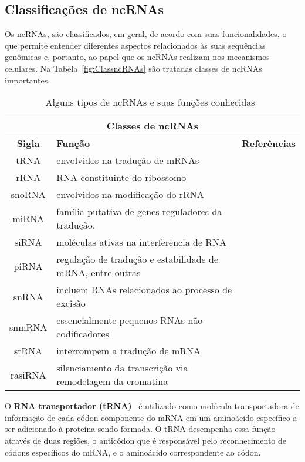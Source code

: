 \subsection{Classificações de ncRNAs} \label{sec:ClassNCrnas}

Os ncRNAs, são classificados, em geral, de acordo com suas funcionalidades, o que permite entender diferentes aspectos relacionados às suas sequências genômicas e, portanto, ao papel que os ncRNAs realizam nos mecanismos celulares. Na Tabela~\ref{fig:ClassncRNAs} são tratadas classes de ncRNAs importantes.

\begin{table}[ht]
 \caption{Alguns tipos de ncRNAs e suas funções conhecidas~\citep{setubal1997introduction:1997,eddy2001non:2001}} \label{fig:ClassncRNAs}\begin{tabular}{|c|l|l|}
\hline
\multicolumn{ 3}{|c|}{\textbf{Classes de ncRNAs}} \\ \hline
\textbf{Sigla} &  \textbf{Função}   & \textbf{Referências} \\ \hline
tRNA &  envolvidos na tradução de mRNAs &~\citep{pavon2009trna:2009}\\ \hline
rRNA &  RNA constituinte do ribossomo &~\citep{eddy2001non:2001} \\ \hline
snoRNA &  envolvidos na modificação do rRNA &~\citep{durbin1998biological:1998}  \\ \hline
miRNA &  família putativa de genes reguladores da tradução. &~\citep{mendell2005micrornas:2005}  \\ \hline
siRNA &  moléculas ativas na interferência de RNA &~\citep{eddy2001non:2001}\\ \hline
piRNA &  regulação de tradução e estabilidade de mRNA, entre outras &~\citep{brennecke2007discrete:2007}  \\ \hline
snRNA &  incluem RNAs relacionados ao processo de excisão &~\citep{stryer:2002}\\ \hline
snmRNA &  essencialmente pequenos RNAs não-codificadores &~\citep{huttenhofer2001rnomics:2001}  \\ \hline
stRNA &  interrompem a tradução de mRNA &~\citep{eddy2001non:2001}  \\ \hline
rasiRNA &  silenciamento da transcrição via remodelagem da cromatina &~\citep{xie2004genetic:2004}  \\ \hline
\end{tabular}
\label{}
\end{table}


O \textbf{RNA transportador (tRNA)}~\citep{pavon2009trna:2009} é utilizado como molécula transportadora de informação de cada códon componente do mRNA em um aminoácido específico a ser adicionado à proteína sendo formada. O tRNA desempenha essa função através de duas regiões, o anticódon que é responsável pelo reconhecimento de códons específicos do mRNA, e o aminoácido correspondente ao códon.

